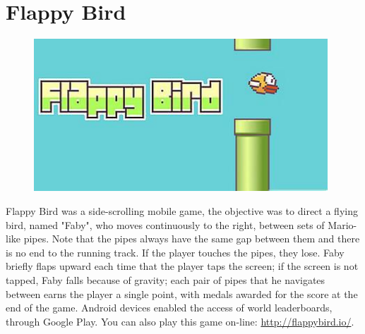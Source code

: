 \documentclass[a4paper, 11pt]{article}
\begin{document}
\section{Flappy Bird}
\begin{figure}[H]
\centering
\includegraphics[width=11cm]{fig/bird}
\end{figure}
Flappy Bird was a side-scrolling mobile game, the objective was to direct a flying bird, named "Faby", who moves continuously to the right, between sets of Mario-like pipes. Note that the pipes always have the same gap between them and there is no end to the running track. If the player touches the pipes, they lose. Faby briefly flaps upward each time that the player taps the screen; if the screen is not tapped, Faby falls because of gravity; each pair of pipes that he navigates between earns the player a single point, with medals awarded for the score at the end of the game. Android devices enabled the access of world leaderboards, through Google Play. You can also play this game on-line: \url{http://flappybird.io/}.
\end{document}
